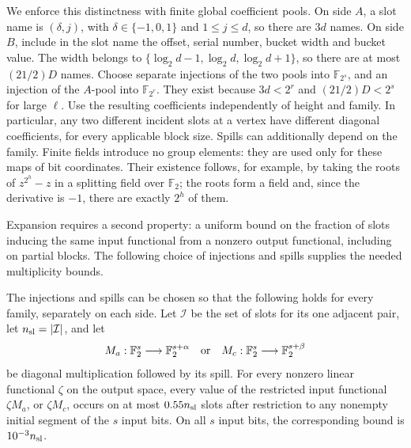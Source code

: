 We enforce this distinctness with finite global coefficient pools.
On side \(A\), a slot name is \((\delta,j)\), with
\(\delta\in\{-1,0,1\}\) and \(1\leq j\leq d\), so there are
\(3d\) names.  On side \(B\), include in the slot name the offset,
serial number, bucket width and bucket value.  The width belongs to
\(\{\log_2d-1,\log_2d,\log_2d+1\}\), so there are at most
\((21/2)D\) names.  Choose separate injections of the two pools into
\(\mathbb F _{2^s}\), and an injection of the \(A\)-pool into
\(\mathbb F _{2^r}\).  They exist because
\(3d<2^r\) and \((21/2)D<2^s\) for large \(\ell\).
Use the resulting coefficients independently of height and family.
In particular, any two different incident slots at a vertex have
different diagonal coefficients, for every applicable block size.
Spills can additionally depend on the family.  Finite fields introduce
no group elements: they are used only for these maps of bit coordinates.
Their existence follows, for example, by taking the roots of
\(z^{2^h}-z\) in a splitting field over \(\mathbb F _2\); the roots
form a field and, since the derivative is \(-1\), there are exactly
\(2^h\) of them.

Expansion requires a second property: a uniform bound on the fraction of
slots inducing the same input functional from a nonzero output functional,
including on partial blocks.  The following choice of injections and spills
supplies the needed multiplicity bounds.

\begin{lemma}
\label{tow:coefficient-choice}
The injections and spills can be chosen so that the following holds
for every family, separately on each side.  Let \(\mathcal I\) be
the set of slots for its one adjacent pair, let \(n_{\rm sl}=|\mathcal
I|\), and let
\[
 M_a:\mathbb F _2^s\longrightarrow\mathbb F _2^{s+\alpha}
 \quad\hbox{or}\quad
 M_c:\mathbb F _2^s\longrightarrow\mathbb F _2^{s+\beta}
\]
be diagonal multiplication followed by its spill.  For every nonzero
linear functional \(\zeta\) on the output space, every value of the
restricted input functional \(\zeta M_a\), or \(\zeta M_c\), occurs
on at most \(0.55n_{\rm sl}\) slots after restriction to any nonempty
initial segment of the \(s\) input bits.  On all \(s\) input bits,
the corresponding bound is \(10^{-3}n_{\rm sl}\).
\end{lemma}

